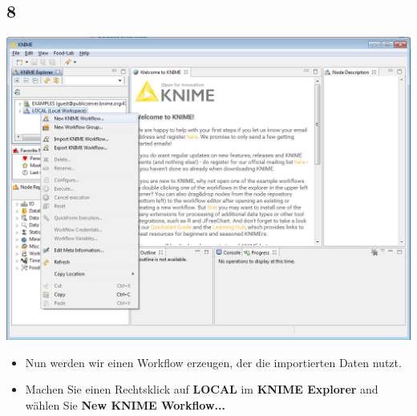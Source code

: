 \documentclass{beamer}
\begin{document}
\subsection{8}
\begin{frame}
	\begin{center}
  		\includegraphics[height=0.6\textheight]{8.png}
	\end{center}
	\begin{itemize}
		\item Nun werden wir einen Workflow erzeugen, der die importierten Daten nutzt.
		\item Machen Sie einen Rechtsklick auf \textbf{LOCAL} im \textbf{KNIME Explorer} and wählen Sie \textbf{New KNIME Workflow...}
	\end{itemize}
\end{frame}
\end{document}
